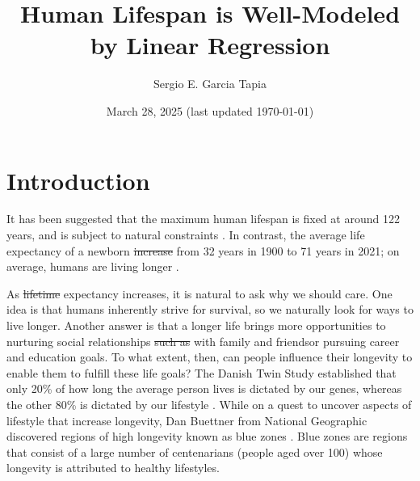 \documentclass[12pt]{article}
\title{Human Lifespan is Well-Modeled by Linear Regression}
\author{Sergio E. Garcia Tapia}
\date{March 28, 2025 (last updated \today)}
\providecommand{\DIFaddtex}[1]{{\protect\color{blue}\uwave{#1}}} %
\providecommand{\DIFdeltex}[1]{{\protect\color{red}\sout{#1}}}                      %
\providecommand{\DIFaddbegin}{} %
\providecommand{\DIFaddend}{} %
\providecommand{\DIFdelbegin}{} %
\providecommand{\DIFdelend}{} %
\providecommand{\DIFadd}[1]{\texorpdfstring{\DIFaddtex{#1}}{#1}} %
\providecommand{\DIFdel}[1]{\texorpdfstring{\DIFdeltex{#1}}{}} %
\begin{document}
	\maketitle
	\section{Introduction}
	It has been suggested that the maximum human lifespan is fixed at around
	122 years, and is subject to natural constraints \cite{NLoM-maximal-lifespan}.
	In contrast, the average life expectancy of a newborn \DIFdelbegin \DIFdel{increase }\DIFdelend \DIFaddbegin \DIFadd{increased }\DIFaddend from 32 years in 1900 to
	71 years in 2021; on average, humans are living longer \cite{owid-life-expectancy}.

	As \DIFdelbegin \DIFdel{lifetime }\DIFdelend \DIFaddbegin \DIFadd{life }\DIFaddend expectancy increases, it is natural to ask why we should care.
	One idea is that humans inherently strive for survival, so we naturally look
	for ways to live longer. Another answer is that a longer life brings more
	opportunities to nurturing social relationships \DIFdelbegin \DIFdel{such as }\DIFdelend with family and friends\DIFaddbegin \DIFadd{,
	}\DIFaddend or pursuing career and education goals. To what extent, then, can people influence their
	longevity to enable them to fulfill these life goals? The Danish Twin Study
	established that only 20\% of how long the average person lives is dictated by our
	genes, whereas the other 80\% is dictated by our lifestyle \cite{PMC-blue-zones}.
	While on a quest to uncover aspects of lifestyle that increase longevity,
	Dan Buettner from National Geographic discovered regions of high longevity known
	as blue zones \cite{PMC-blue-zones}. Blue zones are regions that consist of a large
	number of centenarians (people aged over 100) whose longevity is attributed to healthy
	lifestyles.
\end{document}
